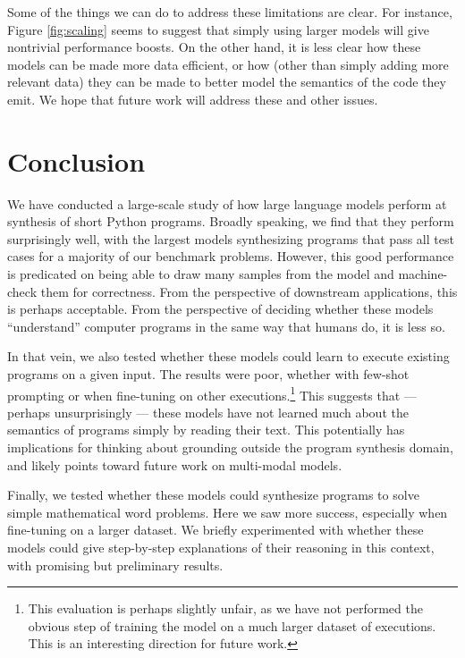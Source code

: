 Some of the things we can do to address these limitations are clear. For instance, Figure \ref{fig:scaling} seems to suggest that simply using larger models will give nontrivial performance boosts. On the other hand, it is less clear how these models can be made more data efficient, or how (other than simply adding more relevant data) they can be made to better model the semantics of the code they emit. We hope that future work will address these and other issues.

\section{Conclusion}
We have conducted a large-scale study of how large language models perform at synthesis of short Python programs. Broadly speaking, we find that they perform surprisingly well, with the largest models synthesizing programs that pass all test cases for a majority of our benchmark problems. However, this good performance is predicated on being able to draw many samples from the model and machine-check them for correctness. From the perspective of downstream applications, this is perhaps acceptable. From the perspective of deciding whether these models ``understand'' computer programs in the same way that humans do, it is less so.

In that vein, we also tested whether these models could learn to execute existing programs on a given input. The results were poor, whether with few-shot prompting or when fine-tuning on other executions.\footnote{
This evaluation is perhaps slightly unfair, as we have not performed the obvious step of training the model on a much larger dataset of executions. This is an interesting direction for future work. } This suggests that --- perhaps unsurprisingly --- these models have not learned much about the semantics of programs simply by reading their text. This potentially has implications for thinking about grounding outside the program synthesis domain, and likely points toward future work on multi-modal models.

Finally, we tested whether these models could synthesize programs to solve simple mathematical word problems. Here we saw more success, especially when fine-tuning on a larger dataset. We briefly experimented with whether these models could give step-by-step explanations of their reasoning in this context, with promising but preliminary results.


